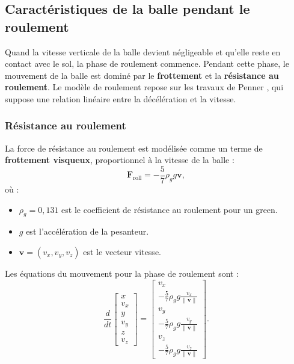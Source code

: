 \documentclass[10pt,a4paper]{report}
\begin{document}
\subsection{Caractéristiques de la balle pendant le roulement}
\label{subsec:rolling_characteristics}

Quand la vitesse verticale de la balle devient négligeable et qu'elle reste en contact avec le sol, la phase de roulement commence. Pendant cette phase, le mouvement de la balle est dominé par le \textbf{frottement} et la \textbf{résistance au roulement}. Le modèle de roulement repose sur les travaux de Penner \cite{PA022,PA07}, qui suppose une relation linéaire entre la décélération et la vitesse.

\subsubsection{Résistance au roulement}
\label{subsubsec:rolling_resistance}

La force de résistance au roulement est modélisée comme un terme de \textbf{frottement visqueux}, proportionnel à la vitesse de la balle :
\[
\mathbf{F}_{\text{roll}} = -\frac{5}{7} \rho_g g \mathbf{v},
\]
où :
\begin{itemize}
    \item $\rho_g = 0{,}131$ est le coefficient de résistance au roulement pour un green.
    \item $g$ est l'accélération de la pesanteur.
    \item $\mathbf{v} = (v_x, v_y, v_z)$ est le vecteur vitesse.
\end{itemize}

Les équations du mouvement pour la phase de roulement sont :
\[
\frac{d}{dt}
\begin{bmatrix}
x \\ v_x \\ y \\ v_y \\ z \\ v_z
\end{bmatrix}
=
\begin{bmatrix}
v_x \\
-\frac{5}{7} \rho_g g \frac{v_x}{\|\mathbf{v}\|} \\
v_y \\
-\frac{5}{7} \rho_g g \frac{v_y}{\|\mathbf{v}\|} \\
v_z \\
-\frac{5}{7} \rho_g g \frac{v_z}{\|\mathbf{v}\|}
\end{bmatrix}.
\]
\end{document}
